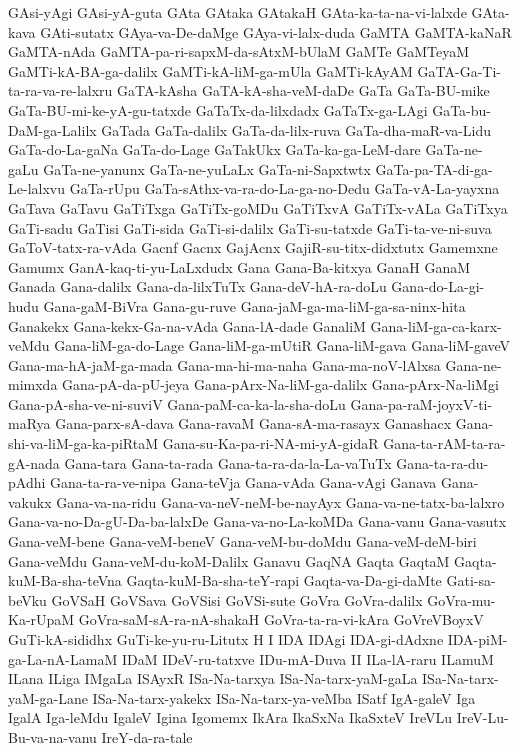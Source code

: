{GAsi-yAgi
GAsi-yA-guta
GAta
GAtaka
GAtakaH
GAta-ka-ta-na-vi-lalxde
GAta-kava
GAti-sutatx
GAya-va-De-daMge
GAya-vi-lalx-duda
GaMTA
GaMTA-kaNaR
GaMTA-nAda
GaMTA-pa-ri-sapxM-da-sAtxM-bUlaM
GaMTe
GaMTeyaM
GaMTi-kA-BA-ga-dalilx
GaMTi-kA-liM-ga-mUla
GaMTi-kAyAM
GaTA-Ga-Ti-ta-ra-va-re-lalxru
GaTA-kAsha
GaTA-kA-sha-veM-daDe
GaTa
GaTa-BU-mike
GaTa-BU-mi-ke-yA-gu-tatxde
GaTaTx-da-lilxdadx
GaTaTx-ga-LAgi
GaTa-bu-DaM-ga-Lalilx
GaTada
GaTa-dalilx
GaTa-da-lilx-ruva
GaTa-dha-maR-va-Lidu
GaTa-do-La-gaNa
GaTa-do-Lage
GaTakUkx
GaTa-ka-ga-LeM-dare
GaTa-ne-gaLu
GaTa-ne-yanunx
GaTa-ne-yuLaLx
GaTa-ni-Sapxtwtx
GaTa-pa-TA-di-ga-Le-lalxvu
GaTa-rUpu
GaTa-sAthx-va-ra-do-La-ga-no-Dedu
GaTa-vA-La-yayxna
GaTava
GaTavu
GaTiTxga
GaTiTx-goMDu
GaTiTxvA
GaTiTx-vALa
GaTiTxya
GaTi-sadu
GaTisi
GaTi-sida
GaTi-si-dalilx
GaTi-su-tatxde
GaTi-ta-ve-ni-suva
GaToV-tatx-ra-vAda
Gacnf
Gacnx
GajAcnx
GajiR-su-titx-didxtutx
Gamemxne
Gamumx
GanA-kaq-ti-yu-LaLxdudx
Gana
Gana-Ba-kitxya
GanaH
GanaM
Ganada
Gana-dalilx
Gana-da-lilxTuTx
Gana-deV-hA-ra-doLu
Gana-do-La-gi-hudu
Gana-gaM-BiVra
Gana-gu-ruve
Gana-jaM-ga-ma-liM-ga-sa-ninx-hita
Ganakekx
Gana-kekx-Ga-na-vAda
Gana-lA-dade
GanaliM
Gana-liM-ga-ca-karx-veMdu
Gana-liM-ga-do-Lage
Gana-liM-ga-mUtiR
Gana-liM-gava
Gana-liM-gaveV
Gana-ma-hA-jaM-ga-mada
Gana-ma-hi-ma-naha
Gana-ma-noV-lAlxsa
Gana-ne-mimxda
Gana-pA-da-pU-jeya
Gana-pArx-Na-liM-ga-dalilx
Gana-pArx-Na-liMgi
Gana-pA-sha-ve-ni-suviV
Gana-paM-ca-ka-la-sha-doLu
Gana-pa-raM-joyxV-ti-maRya
Gana-parx-sA-dava
Gana-ravaM
Gana-sA-ma-rasayx
Ganashacx
Gana-shi-va-liM-ga-ka-piRtaM
Gana-su-Ka-pa-ri-NA-mi-yA-gidaR
Gana-ta-rAM-ta-ra-gA-nada
Gana-tara
Gana-ta-rada
Gana-ta-ra-da-la-La-vaTuTx
Gana-ta-ra-du-pAdhi
Gana-ta-ra-ve-nipa
Gana-teVja
Gana-vAda
Gana-vAgi
Ganava
Gana-vakukx
Gana-va-na-ridu
Gana-va-neV-neM-be-nayAyx
Gana-va-ne-tatx-ba-lalxro
Gana-va-no-Da-gU-Da-ba-lalxDe
Gana-va-no-La-koMDa
Gana-vanu
Gana-vasutx
Gana-veM-bene
Gana-veM-beneV
Gana-veM-bu-doMdu
Gana-veM-deM-biri
Gana-veMdu
Gana-veM-du-koM-Dalilx
Ganavu
GaqNA
Gaqta
GaqtaM
Gaqta-kuM-Ba-sha-teVna
Gaqta-kuM-Ba-sha-teY-rapi
Gaqta-va-Da-gi-daMte
Gati-sa-beVku
GoVSaH
GoVSava
GoVSisi
GoVSi-sute
GoVra
GoVra-dalilx
GoVra-mu-Ka-rUpaM
GoVra-saM-sA-ra-nA-shakaH
GoVra-ta-ra-vi-kAra
GoVreVBoyxV
GuTi-kA-sididhx
GuTi-ke-yu-ru-Litutx
H
I
IDA
IDAgi
IDA-gi-dAdxne
IDA-piM-ga-La-nA-LamaM
IDaM
IDeV-ru-tatxve
IDu-mA-Duva
II
ILa-lA-raru
ILamuM
ILana
ILiga
IMgaLa
ISAyxR
ISa-Na-tarxya
ISa-Na-tarx-yaM-gaLa
ISa-Na-tarx-yaM-ga-Lane
ISa-Na-tarx-yakekx
ISa-Na-tarx-ya-veMba
ISatf
IgA-galeV
Iga
IgalA
Iga-leMdu
IgaleV
Igina
Igomemx
IkAra
IkaSxNa
IkaSxteV
IreVLu
IreV-Lu-Bu-va-na-vanu
IreY-da-ra-tale
}
